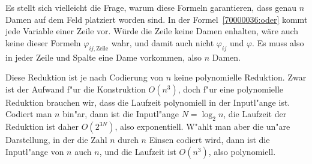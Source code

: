 \begin{diskussion}
Es stellt sich vielleicht die Frage, warum diese Formeln garantieren, dass
genau $n$ Damen auf dem Feld platziert worden sind.
In der Formel~\eqref{70000036:oder} kommt jede Variable einer Zeile vor.
Würde die Zeile keine Damen enhalten, wäre auch keine dieser
Formeln $\varphi_{ij,\text{Zeile}}$ wahr, und damit auch nicht $\varphi_{ij}$
und $\varphi$.
Es muss also in jeder Zeile und Spalte eine Dame vorkommen, also $n$
Damen.

Diese Reduktion ist je nach Codierung von $n$ keine polynomielle Reduktion.
Zwar ist der Aufwand f"ur die Konstruktion $O(n^3)$, doch f"ur eine
polynomielle Reduktion brauchen wir, dass die Laufzeit polynomiell in
der Inputl"ange ist.
Codiert man $n$ bin"ar, dann ist die Inputl"ange $N=\log_2n$, die Laufzeit
der Reduktion ist daher $O(2^{3N})$, also exponentiell.
W"ahlt man aber die un"are Darstellung, in der die Zahl $n$ durch $n$ Einsen
codiert wird, dann ist die Inputl"ange von $n$ auch $n$, und die Laufzeit
ist $O(n^ 3)$, also polynomiell.
\end{diskussion}


